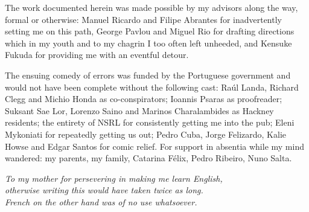 \begin{acknowledgements}

The work documented herein was made possible by my advisors along the way, formal or otherwise: Manuel Ricardo and Filipe Abrantes for inadvertently setting me on this path, George Pavlou and Miguel Rio for drafting directions which in my youth and to my chagrin I too often left unheeded, and Kensuke Fukuda for providing me with an eventful detour.

The ensuing comedy of errors was funded by the Portuguese government and would not have been complete without the following cast: 
Ra\'{u}l Landa, Richard Clegg and Michio Honda as co-conspirators; 
Ioannis Psaras as proofreader;
Suksant Sae Lor, Lorenzo Saino and Marinos Charalambides as Hackney residents; 
the entirety of NSRL for consistently getting me into the pub;
Eleni Mykoniati for repeatedly getting us out;
Pedro Cuba, Jorge Felizardo, Kalie Howse and Edgar Santos for comic relief.
For support in absentia while my mind wandered: my parents, my family, Catarina F\'{e}lix, Pedro Ribeiro, Nuno Salta.


\end{acknowledgements}

\hphantom{}\vfill
\newpage
\thispagestyle{empty}
\vspace*{1.75in}
\begin{flushright} 
\textit{
To my mother for persevering in making me learn English, \\
otherwise writing this would have taken twice as long. \\
French on the other hand was of no use whatsoever. \\
}
\end{flushright}



